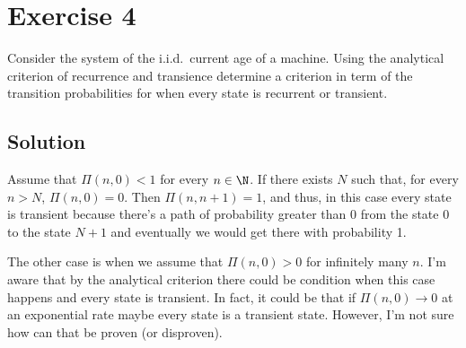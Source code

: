 \section*{Exercise 4}

Consider the system of the i.i.d.~current age of a machine. Using the analytical criterion of recurrence and transience determine a criterion in term of the transition probabilities for when every state is recurrent or transient.

\subsection*{Solution}

Assume that $\Pi(n,0) < 1$ for every $n\in \N$. If there exists $N$ such that, for every $n > N$, $\Pi(n,0) = 0$. Then $\Pi(n,n+1) = 1$, and thus, in this case every state is transient because there's a path of probability greater than 0 from the state $0$ to the state $N+1$ and eventually we would get there with probability 1. 

The other case is when we assume that $\Pi(n,0) > 0$ for infinitely many $n$. I'm aware that by the analytical criterion there could be condition when this case happens and every state is transient. In fact, it could be that if $\Pi(n,0) \to 0$ at an exponential rate maybe every state is a transient state. However, I'm not sure how can that be proven (or disproven).